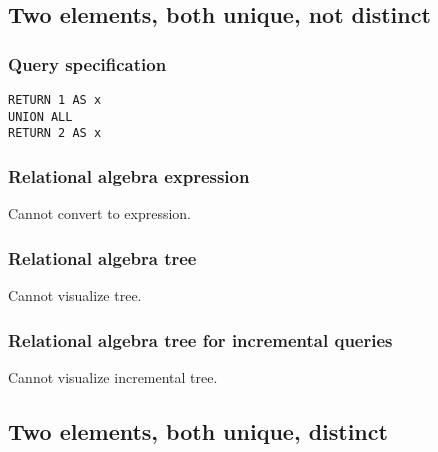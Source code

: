 
\subsection{Two elements, both unique, not distinct}

\subsubsection*{Query specification}

\begin{lstlisting}
RETURN 1 AS x
UNION ALL
RETURN 2 AS x
\end{lstlisting}

\subsubsection*{Relational algebra expression}

Cannot convert to expression.

\subsubsection*{Relational algebra tree}

Cannot visualize tree.

\subsubsection*{Relational algebra tree for incremental queries}

Cannot visualize incremental tree.

\subsection{Two elements, both unique, distinct}

